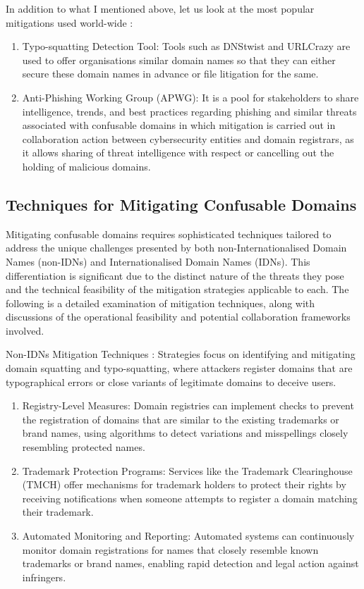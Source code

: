 In addition to what I mentioned above, let us look at the most popular mitigations used world-wide :

\begin{enumerate}
 
  \item Typo-squatting Detection Tool: Tools such as DNStwist and URLCrazy are used to offer organisations similar domain names so that they can either secure these domain names in advance or file litigation for the same.
  \item Anti-Phishing Working Group (APWG): It is a pool for stakeholders to share intelligence, trends, and best practices regarding phishing and similar threats associated with confusable domains in which mitigation is carried out in collaboration action between cybersecurity entities and domain registrars, as it allows sharing of threat intelligence with respect or cancelling out the holding of malicious domains.
\end{enumerate}

\subsection{Techniques for Mitigating Confusable Domains}

Mitigating confusable domains requires sophisticated techniques tailored to address the unique challenges presented by both non-Internationalised Domain Names (non-IDNs) and Internationalised Domain Names (IDNs). This differentiation is significant due to the distinct nature of the threats they pose and the technical feasibility of the mitigation strategies applicable to each. The following is a detailed examination of mitigation techniques, along with discussions of the operational feasibility and potential collaboration frameworks involved.

Non-IDNs Mitigation Techniques : Strategies focus on identifying and mitigating domain squatting and typo-squatting, where attackers register domains that are typographical errors or close variants of legitimate domains to deceive users.

\begin{enumerate}
  \item Registry-Level Measures: Domain registries can implement checks to prevent the registration of domains that are similar to the existing trademarks or brand names, using algorithms to detect variations and misspellings closely resembling protected names. \cite{WTR2020} 
  \item Trademark Protection Programs: Services like the Trademark Clearinghouse (TMCH) offer mechanisms for trademark holders to protect their rights by receiving notifications when someone attempts to register a domain matching their trademark. \cite{ICANNTMCH}
  \item Automated Monitoring and Reporting: Automated systems can continuously monitor domain registrations for names that closely resemble known trademarks or brand names, enabling rapid detection and legal action against infringers. \cite{TMCH2023}
\end{enumerate}

